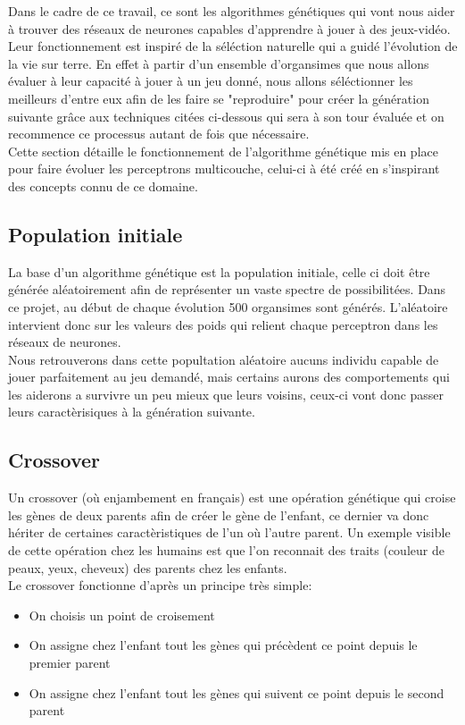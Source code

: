 \documentclass{article}
\begin{document}
Dans le cadre de ce travail, ce sont les algorithmes génétiques qui vont nous aider à trouver des réseaux de neurones capables d'apprendre à jouer à des jeux-vidéo. Leur fonctionnement est inspiré de la séléction naturelle qui a guidé l'évolution de la vie sur terre. En effet à partir d'un ensemble d'organsimes que nous allons évaluer à leur capacité à jouer à un jeu donné, nous allons séléctionner les meilleurs d'entre eux afin de les faire se "reproduire" pour créer la génération suivante grâce aux techniques citées ci-dessous qui sera à son tour évaluée et on recommence ce processus autant de fois que nécessaire.\\

Cette section détaille le fonctionnement de l'algorithme génétique mis en place pour faire évoluer les perceptrons multicouche, celui-ci à été créé en s'inspirant des concepts connu de ce domaine.

\subsection{Population initiale}

La base d'un algorithme génétique est la population initiale, celle ci doit être générée aléatoirement afin de représenter un vaste spectre de possibilitées. Dans ce projet, au début de chaque évolution 500 organsimes sont générés. L'aléatoire intervient donc sur les valeurs des poids qui relient chaque perceptron dans les réseaux de neurones.\\
Nous retrouverons dans cette popultation aléatoire aucuns individu capable de jouer parfaitement au jeu demandé, mais certains aurons des comportements qui les aiderons a survivre un peu mieux que leurs voisins, ceux-ci vont donc passer leurs caractèrisiques à la génération suivante.

\subsection{Crossover}

Un crossover (où enjambement en français) est une opération génétique qui croise les gènes de deux parents afin de créer le gène de l'enfant, ce dernier va donc hériter de certaines caractèristiques de l'un où l'autre parent. Un exemple visible de cette opération chez les humains est que l'on reconnait des traits (couleur de peaux, yeux, cheveux) des parents chez les enfants.\\

Le crossover fonctionne d'après un principe très simple:\\
\begin{itemize}
\item On choisis un point de croisement
\item On assigne chez l'enfant tout les gènes qui précèdent ce point depuis le premier parent
\item On assigne chez l'enfant tout les gènes qui suivent ce point depuis le second parent
\end{itemize}
\end{document}
